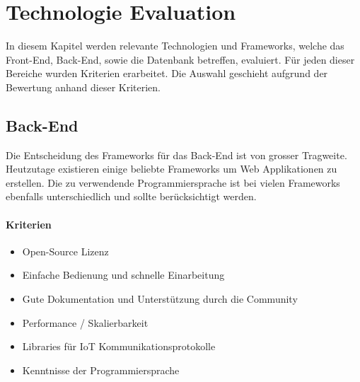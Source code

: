 \chapter{Technologie Evaluation}
In diesem Kapitel werden relevante Technologien und Frameworks, welche das Front-End, Back-End, sowie die Datenbank betreffen, evaluiert. Für jeden dieser Bereiche wurden Kriterien erarbeitet. Die Auswahl geschieht aufgrund der Bewertung anhand dieser Kriterien.

\section{Back-End}
Die Entscheidung des Frameworks für das Back-End ist von grosser Tragweite. Heutzutage existieren einige beliebte Frameworks um Web Applikationen zu erstellen. Die zu verwendende Programmiersprache ist bei vielen Frameworks ebenfalls unterschiedlich und sollte berücksichtigt werden.

\subsubsection{Kriterien}
\begin{itemize}
\item Open-Source Lizenz
\item Einfache Bedienung und schnelle Einarbeitung
\item Gute Dokumentation und Unterstützung durch die Community
\item Performance / Skalierbarkeit
\item Libraries für IoT Kommunikationsprotokolle
\item Kenntnisse der Programmiersprache
\end{itemize}

